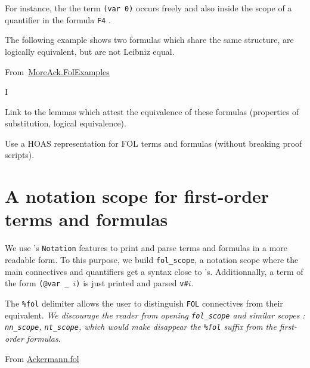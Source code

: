For instance, the the  term \texttt{(var 0)}
occurs freely and also inside the scope of a quantifier in the
formula \texttt{F4} .

The following example shows two formulas which share the same structure, are logically equivalent, but are not Leibniz equal.



\vspace{4pt}

\noindent From~\href{../theories/html/hydras.MoreAck.FolExamples.html}{MoreAck.FolExamples}
  

I

  \begin{todo}
   Link to the lemmas which attest the equivalence of these formulas (properties of substitution, logical equivalence).
  \end{todo}


  \begin{project}
 Use a HOAS representation for FOL terms and formulas (without breaking proof scripts).   
  \end{project}



\section{A notation scope for first-order terms and formulas}
\label{sect:fol-notations}


 We use \coq's \texttt{Notation} features to print and parse terms and formulas  in a more readable form.
To this purpose, we build \texttt{fol\_scope}, a  notation scope
where the main connectives and quantifiers get a syntax close to \coq's.  Additionnally, a term of the form \texttt{(@var \_ $i$)} is
just printed and parsed  \texttt{v\#$i$}.



The \texttt{\%fol} delimiter 
allows the user to distinguish \texttt{FOL} connectives from their \coq equivalent.
\emph{We discourage the reader from \emph{opening} \texttt{fol\_scope} and similar scopes : \texttt{nn\_scope}, \texttt{nt\_scope}, which would make disappear the \texttt{\%fol} suffix from the first-order formulas}.


\vspace{6pt}

\noindent From \href{../theories/html/hydras.Ackermann.fol.html}{Ackermann.fol}

